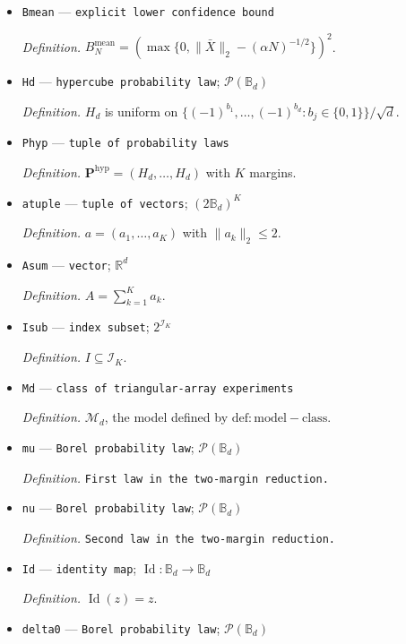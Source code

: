 \documentclass{article}
\begin{document}
\begin{itemize}
  \item \texttt{Bmean} --- \texttt{explicit lower confidence bound}
  \par\smallskip\noindent\emph{Definition.} \(B_N^{\mathrm{mean}}=(\max\{0,\|\bar X\|_2-(\alpha N)^{-1/2}\})^2\).
  \item \texttt{Hd} --- \texttt{hypercube probability law}; \(\mathcal P(\mathbb B_d)\)
  \par\smallskip\noindent\emph{Definition.} \(H_d\) is uniform on \(\{(-1)^{b_1},\ldots,(-1)^{b_d}:b_j\in\{0,1\}\}/\sqrt d\).
  \item \texttt{Phyp} --- \texttt{tuple of probability laws}
  \par\smallskip\noindent\emph{Definition.} \(\mathbf P^{\mathrm{hyp}}=(H_d,\ldots,H_d)\) with \(K\) margins.
  \item \texttt{atuple} --- \texttt{tuple of vectors}; \((2\mathbb B_d)^K\)
  \par\smallskip\noindent\emph{Definition.} \(a=(a_1,\ldots,a_K)\) with \(\|a_k\|_2\le2\).
  \item \texttt{Asum} --- \texttt{vector}; \(\mathbb R^d\)
  \par\smallskip\noindent\emph{Definition.} \(A=\sum_{k=1}^K a_k\).
  \item \texttt{Isub} --- \texttt{index subset}; \(2^{\mathcal I_K}\)
  \par\smallskip\noindent\emph{Definition.} \(I\subseteq\mathcal I_K\).
  \item \texttt{Md} --- \texttt{class of triangular-\allowbreak{}array experiments}
  \par\smallskip\noindent\emph{Definition.} \(\mathcal M_d\), the model defined by \(\mathrm{def:model-class}\).
  \item \texttt{mu} --- \texttt{Borel probability law}; \(\mathcal P(\mathbb B_d)\)
  \par\smallskip\noindent\emph{Definition.} \texttt{First law in the two-\allowbreak{}margin reduction.}
  \item \texttt{nu} --- \texttt{Borel probability law}; \(\mathcal P(\mathbb B_d)\)
  \par\smallskip\noindent\emph{Definition.} \texttt{Second law in the two-\allowbreak{}margin reduction.}
  \item \texttt{Id} --- \texttt{identity map}; \(\operatorname{Id}:\mathbb B_d\to\mathbb B_d\)
  \par\smallskip\noindent\emph{Definition.} \(\operatorname{Id}(z)=z\).
  \item \texttt{delta0} --- \texttt{Borel probability law}; \(\mathcal P(\mathbb B_d)\)

\end{itemize}
\end{document}

